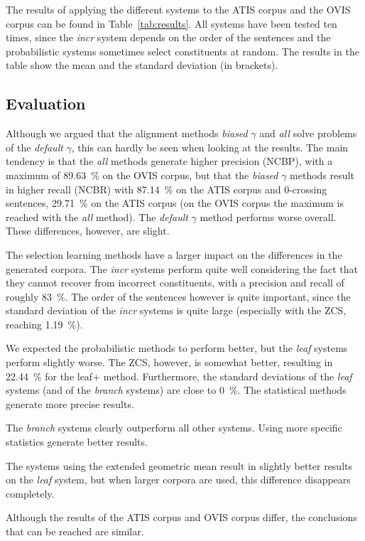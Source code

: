 \documentclass[letterpaper,mlapa]{article}
\begin{document}
The results of applying the different systems to the ATIS corpus and the OVIS
corpus can be found in Table~\ref{tab:results}. All systems have been tested ten
times, since the \emph{incr} system depends on the order of the sentences and
the probabilistic systems sometimes select constituents at random. The results
in the table show the mean and the standard deviation (in brackets).

\subsection{Evaluation}

Although we argued that the alignment methods \emph{biased} $\gamma$ and
\emph{all} solve problems of the \emph{default} $\gamma$, this can hardly be
seen when looking at the results. The main tendency is that the \emph{all}
methods generate higher precision (NCBP), with a maximum of 89.63~\% on the OVIS
corpus, but that the \emph{biased} $\gamma$ methods result in higher recall
(NCBR) with 87.14~\% on the ATIS corpus and 0-crossing sentences, 29.71~\% on
the ATIS corpus (on the OVIS corpus the maximum is reached with the \emph{all}
method). The \emph{default} $\gamma$ method performs worse overall. These
differences, however, are slight.

The selection learning methods have a larger impact on the differences in the
generated corpora. The \emph{incr} systems perform quite well considering the
fact that they cannot recover from incorrect constituents, with a precision and
recall of roughly 83~\%. The order of the sentences however is quite important,
since the standard deviation of the \emph{incr} systems is quite large
(especially with the ZCS, reaching 1.19~\%).

We expected the probabilistic methods to perform better, but the \emph{leaf}
systems perform slightly worse. The ZCS, however, is somewhat better, resulting
in 22.44~\% for the leaf+ method. Furthermore, the standard deviations of the
\emph{leaf} systems (and of the \emph{branch} systems) are close to 0~\%. The
statistical methods generate more precise results.

The \emph{branch} systems clearly outperform all other systems. Using more
specific statistics generate better results.

The systems using the extended geometric mean result in slightly better results
on the \emph{leaf} system, but when larger corpora are used, this difference
disappears completely.

Although the results of the ATIS corpus and OVIS corpus differ, the conclusions
that can be reached are similar.
\end{document}
